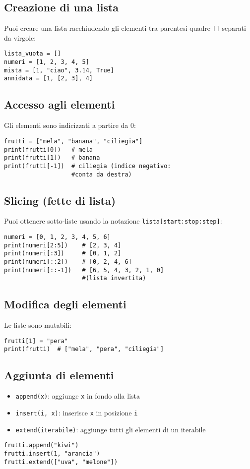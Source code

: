 \documentclass[a4paper,12pt]{article}
\begin{document}
\subsection*{Creazione di una lista}
Puoi creare una lista racchiudendo gli elementi tra parentesi quadre \texttt{[]} separati da virgole:
\begin{lstlisting}
lista_vuota = []
numeri = [1, 2, 3, 4, 5]
mista = [1, "ciao", 3.14, True]
annidata = [1, [2, 3], 4]
\end{lstlisting}

\subsection*{Accesso agli elementi}
Gli elementi sono indicizzati a partire da 0:
\begin{lstlisting}
frutti = ["mela", "banana", "ciliegia"]
print(frutti[0])   # mela
print(frutti[1])   # banana
print(frutti[-1])  # ciliegia (indice negativo:
                   #conta da destra)
\end{lstlisting}

\subsection*{Slicing (fette di lista)}
Puoi ottenere sotto-liste usando la notazione \texttt{lista[start:stop:step]}:
\begin{lstlisting}
numeri = [0, 1, 2, 3, 4, 5, 6]
print(numeri[2:5])    # [2, 3, 4]
print(numeri[:3])     # [0, 1, 2]
print(numeri[::2])    # [0, 2, 4, 6]
print(numeri[::-1])   # [6, 5, 4, 3, 2, 1, 0]
                      #(lista invertita)
\end{lstlisting}

\subsection*{Modifica degli elementi}
Le liste sono mutabili:
\begin{lstlisting}
frutti[1] = "pera"
print(frutti)  # ["mela", "pera", "ciliegia"]
\end{lstlisting}

\subsection*{Aggiunta di elementi}
\begin{itemize}
    \item \texttt{append(x)}: aggiunge \texttt{x} in fondo alla lista
    \item \texttt{insert(i, x)}: inserisce \texttt{x} in posizione \texttt{i}
    \item \texttt{extend(iterabile)}: aggiunge tutti gli elementi di un iterabile
\end{itemize}
\begin{lstlisting}
frutti.append("kiwi")
frutti.insert(1, "arancia")
frutti.extend(["uva", "melone"])
\end{lstlisting}
\end{document}
